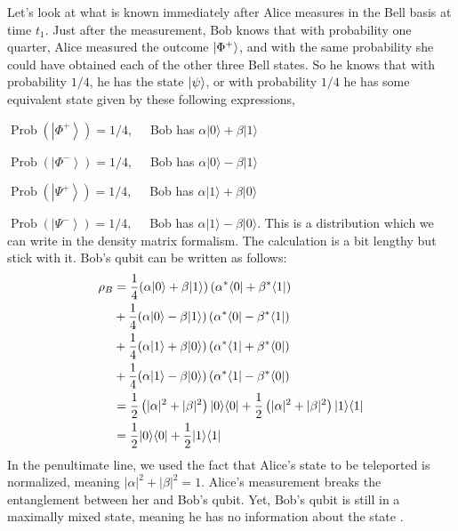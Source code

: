 Let's look at what is known immediately after Alice measures in the Bell basis at time $t_1$.
Just after the measurement, Bob knows that with probability one quarter, Alice measured the outcome $\left| \Phi^+ \right\rangle$, and with the same probability she could have obtained each of the other three  Bell states.
So he knows that with probability $1/4$, he has the state $\left| \psi \right\rangle$, or with probability $1/4$ he has some equivalent state given by these following expressions,

\hspace{2cm} $\operatorname{Prob}\left(\left|\Phi^{+}\right\rangle\right)=1 / 4, \quad$ Bob has $\alpha|0\rangle+\beta|1\rangle$

\hspace{2cm} $\operatorname{Prob}\left(\left|\Phi^{-}\right\rangle\right)=1 / 4, \quad$ Bob has $\alpha|0\rangle-\beta|1\rangle$

\hspace{2cm} $\operatorname{Prob}\left(\left|\Psi^{+}\right\rangle\right)=1 / 4, \quad$ Bob has $\alpha|1\rangle+\beta|0\rangle$

\hspace{2cm} $\operatorname{Prob}\left(\left|\Psi^{-}\right\rangle\right)=1 / 4, \quad$ Bob has $\alpha|1\rangle-\beta|0\rangle$.
This is a distribution which we can write in the density matrix formalism.
The calculation is a bit lengthy but stick with it.
Bob's qubit can be written as follows:
\begin{equation}
\begin{aligned}
    \rho_B &=\frac{1}{4}(\alpha|0\rangle+\beta|1\rangle)\left(\alpha^*\langle 0|+\beta^*\langle 1|\right) \\
    &+\frac{1}{4}(\alpha|0\rangle-\beta|1\rangle)\left(\alpha^*\langle 0|-\beta^*\langle 1|\right) \\
    &+\frac{1}{4}(\alpha|1\rangle+\beta|0\rangle)\left(\alpha^*\langle 1|+\beta^*\langle 0|\right) \\
    &+\frac{1}{4}(\alpha|1\rangle-\beta|0\rangle)\left(\alpha^*\langle 1|-\beta^*\langle 0|\right) \\
    &=\frac{1}{2}\left(|\alpha|^2+|\beta|^2\right)|0 \rangle \langle 0| + \frac{1}{2}\left(|\alpha|^2+|\beta|^2\right)|1 \rangle \langle 1| \\
    &=\frac{1}{2}|0 \rangle \langle 0|+\frac{1}{2}|1 \rangle \langle 1|\\
    \label{eq:Bobs_qubit_t2}
\end{aligned}
\end{equation}
In the penultimate line, we used the fact that Alice's state to be teleported is normalized, meaning $|\alpha|^2+|\beta|^2=1$.
Alice's measurement breaks the entanglement between her and Bob's qubit.
Yet, Bob's qubit is still in a maximally mixed state, meaning he has no information about the state \ket{\psi}.

